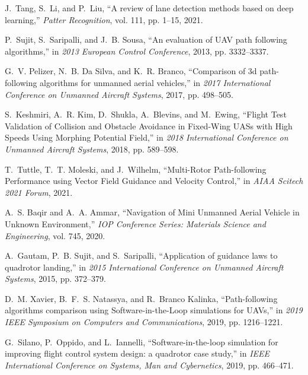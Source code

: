 \documentclass[a4paper,twocolumn,10pt]{article}
\begin{document}
\begin{thebibliography}{10}
        J.~{Tang}, S.~{Li}, and P.~{Liu}, ``{A review of lane detection methods based
        on deep learning},'' \emph{Patter Recognition}, vol. 111, pp. 1--15, 2021.

        P.~{Sujit}, S.~{Saripalli}, and J.~B. {Sousa}, ``{An evaluation of UAV path
        following algorithms},'' in \emph{2013 European Control Conference}, 2013,
        pp. 3332--3337.

        G.~V. {Pelizer}, N.~B. {Da Silva}, and K.~R. {Branco}, ``{Comparison of 3d
        path-following algorithms for unmanned aerial vehicles},'' in \emph{2017
        International Conference on Unmanned Aircraft Systems}, 2017, pp. 498--505.

        S.~{Keshmiri}, A.~R. {Kim}, D.~{Shukla}, A.~{Blevins}, and M.~{Ewing},
        ``{Flight Test Validation of Collision and Obstacle Avoidance in Fixed-Wing
        UASs with High Speeds Using Morphing Potential Field},'' in \emph{2018
        International Conference on Unmanned Aircraft Systems}, 2018, pp. 589--598.

        T.~{Tuttle}, T.~T. {Moleski}, and J.~{Wilhelm}, ``{Multi-Rotor Path-following
        Performance using Vector Field Guidance and Velocity Control},'' in
        \emph{AIAA Scitech 2021 Forum}, 2021.

        A.~S. {Baqir} and A.~A. {Ammar}, ``{Navigation of Mini Unmanned Aerial Vehicle
        in Unknown Environment},'' \emph{IOP Conference Series: Materials Science and
        Engineering}, vol. 745, 2020.

        A.~{Gautam}, P.~B. {Sujit}, and S.~{Saripalli}, ``{Application of guidance laws
        to quadrotor landing},'' in \emph{2015 International Conference on Unmanned
        Aircraft Systems}, 2015, pp. 372--379.

        D.~M. {Xavier}, B.~F.~S. {Natassya}, and R.~{Branco Kalinka}, ``{Path-following
        algorithms comparison using Software-in-the-Loop simulations for UAVs},'' in
        \emph{2019 IEEE Symposium on Computers and Communications}, 2019, pp.
        1216--1221.

        G.~{Silano}, P.~{Oppido}, and L.~{Iannelli}, ``{Software-in-the-loop simulation
        for improving flight control system design: a quadrotor case study},'' in
        \emph{IEEE International Conference on Systems, Man and Cybernetics}, 2019,
        pp. 466--471.


\end{thebibliography}
\end{document}
